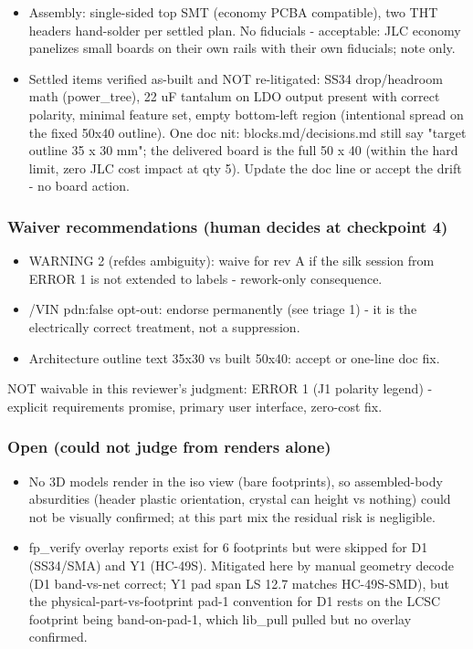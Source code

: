 \documentclass[11pt,a4paper]{article}
\begin{document}
\begin{itemize}
excursion plus one stub in the J2/D2 quadrant - nowhere near the
oscillator or the LDO loop; stitching vias distributed. Clean.
\item Assembly: single-sided top SMT (economy PCBA compatible), two THT headers
hand-solder per settled plan. No fiducials - acceptable: JLC economy
panelizes small boards on their own rails with their own fiducials; note
only.
\item Settled items verified as-built and NOT re-litigated: SS34 drop/headroom
math (power\_tree), 22 uF tantalum on LDO output present with correct
polarity, minimal feature set, empty bottom-left region (intentional
spread on the fixed 50x40 outline). One doc nit: blocks.md/decisions.md
still say "target outline 35 x 30 mm"; the delivered board is the full
50 x 40 (within the hard limit, zero JLC cost impact at qty 5). Update
the doc line or accept the drift - no board action.
\end{itemize}
\subsubsection*{Waiver recommendations (human decides at checkpoint 4)}
\begin{itemize}
\item WARNING 2 (refdes ambiguity): waive for rev A if the silk session from
ERROR 1 is not extended to labels - rework-only consequence.
\item /VIN pdn:false opt-out: endorse permanently (see triage 1) - it is the
electrically correct treatment, not a suppression.
\item Architecture outline text 35x30 vs built 50x40: accept or one-line doc fix.
\end{itemize}
NOT waivable in this reviewer's judgment: ERROR 1 (J1 polarity legend) - explicit requirements promise, primary user interface, zero-cost fix.

\subsubsection*{Open (could not judge from renders alone)}
\begin{itemize}
\item No 3D models render in the iso view (bare footprints), so assembled-body
absurdities (header plastic orientation, crystal can height vs nothing)
could not be visually confirmed; at this part mix the residual risk is
negligible.
\item fp\_verify overlay reports exist for 6 footprints but were skipped for D1
(SS34/SMA) and Y1 (HC-49S). Mitigated here by manual geometry decode
(D1 band-vs-net correct; Y1 pad span LS 12.7 matches HC-49S-SMD), but the
physical-part-vs-footprint pad-1 convention for D1 rests on the LCSC
footprint being band-on-pad-1, which lib\_pull pulled but no overlay
confirmed.
\end{itemize}
\end{document}
